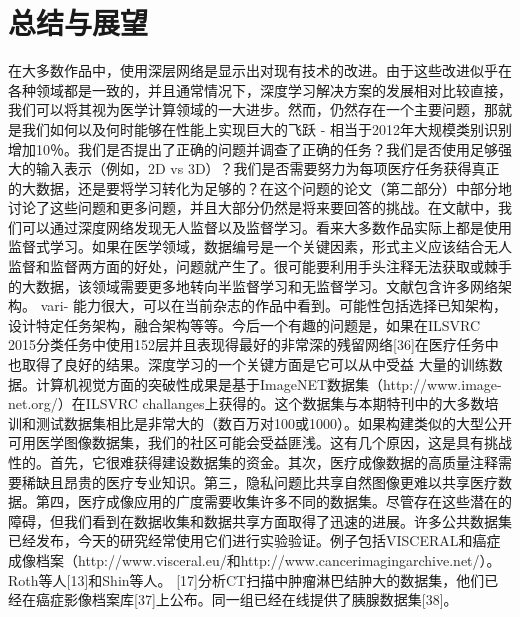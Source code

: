 \chapter{总结与展望}
\label{chap:Sum}

 在大多数作品中，使用深层网络是显示出对现有技术的改进。由于这些改进似乎在各种领域都是一致的，并且通常情况下，深度学习解决方案的发展相对比较直接，我们可以将其视为医学计算领域的一大进步。然而，仍然存在一个主要问题，那就是我们如何以及何时能够在性能上实现巨大的飞跃 - 相当于2012年大规模类别识别增加10％。我们是否提出了正确的问题并调查了正确的任务？我们是否使用足够强大的输入表示（例如，2D vs 3D）？我们是否需要努力为每项医疗任务获得真正的大数据，还是要将学习转化为足够的？在这个问题的论文（第二部分）中部分地讨论了这些问题和更多问题，并且大部分仍然是将来要回答的挑战。在文献中，我们可以通过深度网络发现无人监督以及监督学习。看来大多数作品实际上都是使用监督式学习。如果在医学领域，数据编号是一个关键因素，形式主义应该结合无人监督和监督两方面的好处，问题就产生了。很可能要利用手头注释无法获取或棘手的大数据，该领域需要更多地转向半监督学习和无监督学习。文献包含许多网络架构。 vari-
能力很大，可以在当前杂志的作品中看到。可能性包括选择已知架构，设计特定任务架构，融合架构等等。今后一个有趣的问题是，如果在ILSVRC 2015分类任务中使用152层并且表现得最好的非常深的残留网络[36]在医疗任务中也取得了良好的结果。深度学习的一个关键方面是它可以从中受益
大量的训练数据。计算机视觉方面的突破性成果是基于ImageNET数据集（http://www.image-net.org/）在ILSVRC challanges上获得的。这个数据集与本期特刊中的大多数培训和测试数据集相比是非常大的（数百万对100或1000）。如果构建类似的大型公开可用医学图像数据集，我们的社区可能会受益匪浅。这有几个原因，这是具有挑战性的。首先，它很难获得建设数据集的资金。其次，医疗成像数据的高质量注释需要稀缺且昂贵的医疗专业知识。第三，隐私问题比共享自然图像更难以共享医疗数据。第四，医疗成像应用的广度需要收集许多不同的数据集。尽管存在这些潜在的障碍，但我们看到在数据收集和数据共享方面取得了迅速的进展。许多公共数据集已经发布，今天的研究经常使用它们进行实验验证。例子包括VISCERAL和癌症成像档案（http://www.visceral.eu/和http://www.cancerimagingarchive.net/）。 Roth等人[13]和Shin等人。 [17]分析CT扫描中肿瘤淋巴结肿大的数据集，他们已经在癌症影像档案库[37]上公布。同一组已经在线提供了胰腺数据集[38]。

